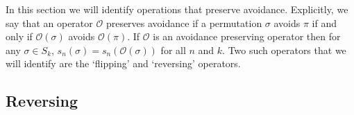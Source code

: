 \documentclass[11pt,letterpaper,twoside,english]{article}
\theoremstyle{theorem}
\theoremstyle{remark}
\begin{document}
In this section we will identify operations that preserve avoidance. Explicitly, we say that an operator $\mathcal{O}$ preserves avoidance if a permutation $\sigma$ avoids $\pi$ if and only if $\mathcal{O}(\sigma)$ avoids $\mathcal{O}(\pi)$. If $\mathcal{O}$ is an avoidance preserving operator then for any $\sigma\in S_k$, $s_n(\sigma)=s_n(\mathcal{O}(\sigma))$ for all $n$ and $k$. Two such operators that we will identify are the `flipping' and `reversing' operators.  

%
%
%
\subsection{Reversing}
\end{document}
